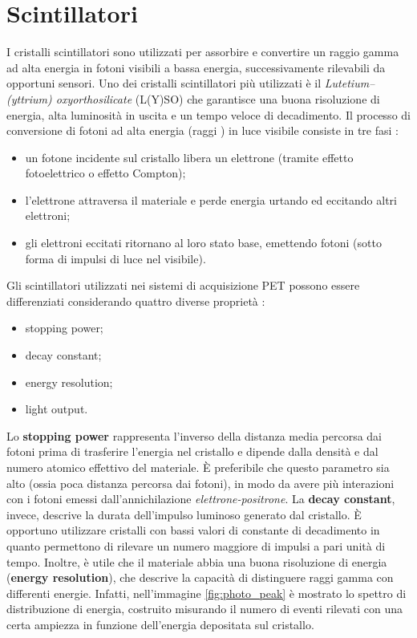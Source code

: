 \section{Scintillatori}
I cristalli scintillatori sono utilizzati per assorbire e convertire un raggio gamma ad alta energia in fotoni visibili a bassa energia, successivamente rilevabili da opportuni sensori. Uno dei cristalli scintillatori più utilizzati è il \textit{Lutetium–(yttrium) oxyorthosilicate} (L(Y)SO) che garantisce una buona risoluzione di energia, alta luminosità in uscita e un tempo veloce di decadimento. Il processo di conversione di fotoni ad alta energia (raggi \textgamma) in luce visibile consiste in tre fasi \cite{RamseyDerek}:
\begin{itemize}
	\item un fotone incidente sul cristallo libera un elettrone (tramite effetto fotoelettrico o effetto Compton);
	\item l'elettrone attraversa il materiale e perde energia urtando ed eccitando altri elettroni;
	\item gli elettroni eccitati ritornano al loro stato base, emettendo fotoni (sotto forma di impulsi di luce nel visibile).
\end{itemize}
Gli scintillatori utilizzati nei sistemi di acquisizione PET possono essere differenziati considerando quattro diverse proprietà \cite{Schmitz2013ThePO}:
\begin{itemize}
	\item stopping power;
	\item decay constant;
	\item energy resolution;
	\item light output.
\end{itemize}
Lo \textbf{stopping power} rappresenta l'inverso della distanza media percorsa dai fotoni prima di trasferire l'energia nel cristallo e dipende dalla densità e dal numero atomico effettivo del materiale. \`E preferibile che questo parametro sia alto (ossia poca distanza percorsa dai fotoni), in modo da avere più interazioni con i fotoni emessi dall'annichilazione \textit{elettrone-positrone}. La \textbf{decay constant}, invece, descrive la durata dell'impulso luminoso generato dal cristallo. \`E opportuno utilizzare cristalli con bassi valori di constante di decadimento in quanto permettono di rilevare un numero maggiore di impulsi a pari unità di tempo. Inoltre, è utile che il materiale abbia una buona risoluzione di energia (\textbf{energy resolution}), che descrive la capacità di distinguere raggi gamma con differenti energie. Infatti, nell'immagine \ref{fig:photo_peak} è mostrato lo spettro di distribuzione di energia, costruito misurando il numero di eventi rilevati con una certa ampiezza in funzione dell'energia depositata sul cristallo.
